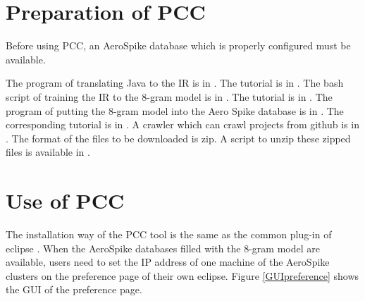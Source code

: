 \documentclass{sig-alternate-05-2015}
\begin{document}
\section{Preparation of PCC}

Before using PCC, an AeroSpike database which is properly configured must be available.

The program of translating Java to the IR is in \cite{programprocessor}. The tutorial is in \cite{programprocessortutorial}. The bash script of training the IR to the 8-gram model is in \cite{ngramtrain}. The tutorial is in \cite{ngramtraintutorial}. The program of putting the 8-gram model into the Aero Spike database is in \cite{modeltoaero}. The corresponding tutorial is in \cite{modeltoaerotutorial}. A crawler which can crawl projects from github is in \cite{gitcrawler}. The format of the files to be downloaded is zip. A script to unzip these zipped files is available in \cite{unzipscript}.

\section{Use of PCC}

The installation way \cite{eclipseplugininstall} of the PCC tool is the same as the common plug-in \cite{eclipseplugins} of eclipse \cite{eclipseplatform}. When the AeroSpike databases filled with the 8-gram model are available, users need to set the IP address of one machine of the AeroSpike clusters on the preference page of their own eclipse. Figure \ref{GUIpreference} shows the GUI of the preference page.
\end{document}
